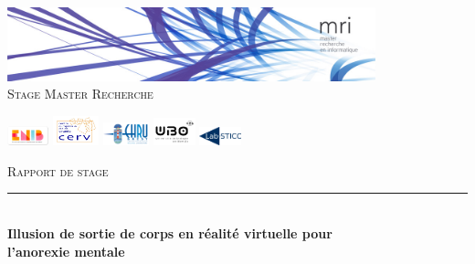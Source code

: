 \documentclass[11pt]{article}
\newcommand{\HRule}{\rule{\linewidth}{0.5mm}}
\begin{document}
\begin{titlepage}

\begin{center}


 

\includegraphics[width=0.8\textwidth]{./header}\\[1cm]
\textsc{\Large Stage Master Recherche}
\vspace{1cm}

\includegraphics[width=0.09\textwidth]{./logo_ENIB}
\includegraphics[width=0.1\textwidth]{./cerv}
\includegraphics[width=0.1\textwidth]{./CHRU-Brest}
\includegraphics[width=0.09\textwidth]{./UBO}
\includegraphics[width=0.09\textwidth]{./logo-labsticc}


  
\vspace{1cm} 
\textsc{\Large Rapport de stage }\\[0.5cm]


\HRule \\[0.4cm]
{ \Large \bfseries Illusion de sortie de corps en réalité virtuelle pour \\l'anorexie mentale }\\[0.4cm]


\end{center}
\end{titlepage}
\end{document}
